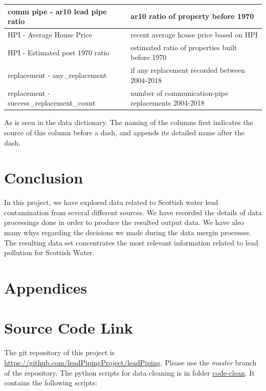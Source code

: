 \documentclass[11pt,twoside]{article}
\numberwithin{Theorem}{section}
\numberwithin{Definition}{section}
\numberwithin{Lemma}{section}
\numberwithin{Algorithm}{section}
\numberwithin{equation}{section}
\begin{document}
\begin{center}
\begin{tabular}{ll}
        \hline
        comm pipe - ar10 lead pipe ratio             &
        ar10 ratio of property before 1970\\
        \hline
        HPI - Average House Price                  &
        recent average house price based on HPI\\
        \hline
        HPI - Estimated post 1970 ratio            &
        estimated ratio of properties built before 1970\\
        \hline
        replacement - any\_replacement              &
        if any replacement recorded between 2004-2018\\
        \hline
        replacement - success\_replacement\_count    &
        number of communication-pipe replacements 2004-2018\\
        \hline
    \end{tabular}
\end{center}
As is seen in the data dictionary. The naming of the columns first indicates the source of this column before a dash, and appends its detailed name after the dash.

\section{Conclusion}
In this project, we have explored data related to Scottish water lead contamination from several different sources. We have recorded the details of data processings done in order to produce the resulted output data. We have also many whys regarding the decisions we made during the data mergin processes. The resulting data set concentrates the most relevant information related to lead pollution for Scottish Water.

\clearpage



\clearpage

\appendix
\section*{Appendices}

\section{Source Code Link}
\label{app:one}

The git repository of this project is \href{https://github.com/leadPipingProject/leadPiping}{https://github.com/leadPipingProject/leadPiping}.
Please use the \textit{master} branch of the repository.
The python scripts for data cleaning is in folder \href{https://github.com/leadPipingProject/leadPiping/tree/master/code-clean}{code-clean}. It contains the following scripts:
\end{document}
